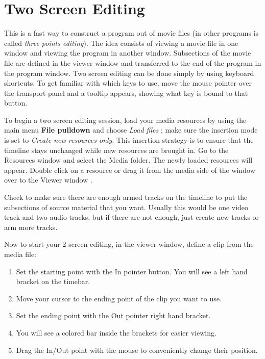 \section{Two Screen Editing}%
\label{sec:two_screen_editing}

This is a fast way to construct a program out of movie files (in
other programs is called \textit{three points editing}). The idea
consists of viewing a movie file in one window and viewing the
program in another window. Subsections of the movie file are defined
in the viewer window and transferred to the end of the program in
the program window.  Two screen editing can be done simply by using
keyboard shortcuts.  To get familiar with which keys to use, move
the mouse pointer over the transport panel and a tooltip appears,
showing what key is bound to that button.

To begin a two screen editing session, load your media resources by
using the main menu \textbf{File pulldown} and choose \textit{Load
  files}  ; make sure the insertion mode is set to \textit{Create new
  resources only}.  This insertion strategy  is to ensure that the
timeline stays unchanged while new resources are brought in. Go to
the Resources window  and select the Media folder. The newly loaded
resources will appear. Double click on a resource or drag it from
the media side of the window over to the Viewer window .

Check to make sure there are enough armed tracks on the timeline to
put the subsections of source material that you want.  Usually this
would be one video track and two audio tracks, but if there are not
enough, just create new tracks or arm more tracks.

Now to start your 2 screen editing, in the viewer window, define a
clip from the media file:

\begin{enumerate}
\item Set the starting point with the In pointer button.  You
  will see a left hand bracket on the timebar.
\item Move your cursor to the ending point of the clip you want
  to use.
\item Set the ending point with the Out pointer right hand
  bracket.
\item You will see a colored bar inside the brackets for easier
  viewing.
\item Drag the In/Out point  with the mouse to conveniently
  change their position.
\end{enumerate}

